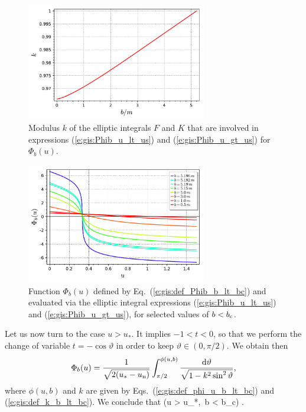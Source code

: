 \begin{figure}
\centerline{\includegraphics[width=0.7\textwidth]{gis_k_b_lt_bc.pdf}}
\caption[]{\label{f:gis:k_b_lt_bc} \footnotesize
Modulus $k$ of the elliptic integrals $F$ and $K$ that are involved
in expressions (\ref{e:gis:Phib_u_lt_us}) and (\ref{e:gis:Phib_u_gt_us})
for $\Phi_b(u)$.}
\end{figure}

\begin{figure}
\centerline{\includegraphics[width=0.7\textwidth]{gis_Phib_b_lt_bc.pdf}}
\caption[]{\label{f:gis:Phib_b_lt_bc} \footnotesize
Function $\Phi_b(u)$ defined by Eq.~(\ref{e:gis:def_Phib_b_lt_bc}) and
evaluated via the elliptic integral expressions (\ref{e:gis:Phib_u_lt_us})
and (\ref{e:gis:Phib_u_gt_us}),
for selected values of $b < b_{\rm c}$.}
\end{figure}

Let us now turn to the case $u>u_*$. It implies $-1 < t < 0$, so that
we perform the change of variable $t = -\cos\vartheta$ in order to keep
$\vartheta\in(0,\pi/2)$. We obtain then
\[
    \Phi_b(u) =  \frac{1}{\sqrt{2(u_* - u_{\rm n})}} \int_{\pi/2}^{\phi(u,b)}
        \frac{\mathrm{d}\vartheta}{\sqrt{1 - k^2 \sin^2\vartheta}} ,
\]
where $\phi(u,b)$ and $k$ are given by Eqs.~(\ref{e:gis:def_phi_u_b_lt_bc})
and (\ref{e:gis:def_k_b_lt_bc}). We conclude that
\be \label{e:gis:Phib_u_gt_us}
    \qquad (u > u_*,\ b < b_{\rm c}) .
\ee

